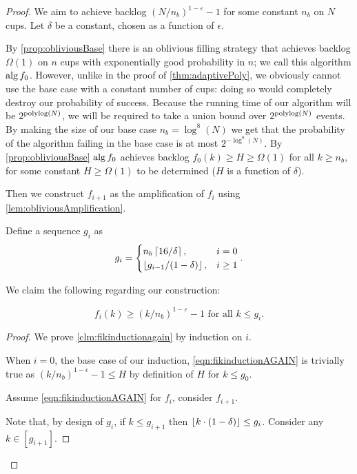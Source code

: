 \begin{proof}
  We aim to achieve backlog $(N/n_b)^{1-\varepsilon}-1$ for some constant $n_b$ on $N$ cups.
  Let $\delta$ be a constant, chosen as a function of $\epsilon$.

  By \cref{prop:obliviousBase} there is an oblivious filling
  strategy that achieves backlog $\Omega(1)$ on $n$ cups with
  exponentially good probability in $n$; we call this algorithm
  $\operatorname{\text{\textup{alg}}}{f_0}$. However, unlike in the proof of
  \cref{thm:adaptivePoly}, we obviously cannot use the base case
  with a constant number of cups: doing so would completely
  destroy our probability of success. Because the running time of
  our algorithm will be $2^{\operatorname{\text{polylog}}(N)}$, we will be required to
  take a union bound over $2^{\operatorname{\text{polylog}}(N)}$ events. By making the
  size of our base case $n_b = \log^8(N)$ we get that the
  probability of the algorithm failing in the base case is at
  most $2^{-\log^8(N)}$. By \cref{prop:obliviousBase} $\operatorname{\text{\textup{alg}}}{f_0}$ achieves
  backlog $f_0(k) \ge H \ge \Omega(1)$ for all $k \ge n_b$, for
  some constant $H \ge \Omega(1)$ to be determined ($H$ is a
  function of $\delta$).

  Then we construct $f_{i+1}$ as the amplification of $f_i$ using
  \cref{lem:obliviousAmplification}.

  Define a sequence $g_i$ as 
  $$g_i =
  \begin{cases}
    n_b\left\lceil 16/\delta \right\rceil, & i=0\\
    \left\lfloor  g_{i-1}/(1-\delta)  \right\rfloor, & i\ge 1 
  \end{cases}.$$

  We claim the following regarding our construction:
  \begin{clm}
    \label{clm:fikinductionagain}
    \begin{equation}
      f_i(k) \ge (k/n_b)^{1-\varepsilon} - 1 \text{ for all } k \le g_i. \label{eqn:fikinductionAGAIN}
    \end{equation}
  \end{clm}
  \begin{proof}
  We prove \cref{clm:fikinductionagain} by induction on $i$. 

  When $i=0$, the base case of our induction,
  \eqref{eqn:fikinductionAGAIN} is trivially true as
  $(k/n_b)^{1-\epsilon} - 1 \le H$ by definition of $H$ for $k\le g_0$.

  Assume \eqref{eqn:fikinductionAGAIN} for $f_i$, consider $f_{i+1}$. 

  Note that, by design of $g_i$, if $k \le g_{i+1}$ then $\left\lfloor k\cdot (1-\delta) \right\rfloor \le g_i$.
  Consider any $k\in [g_{i+1}]$. 


\end{proof}
\end{proof}
